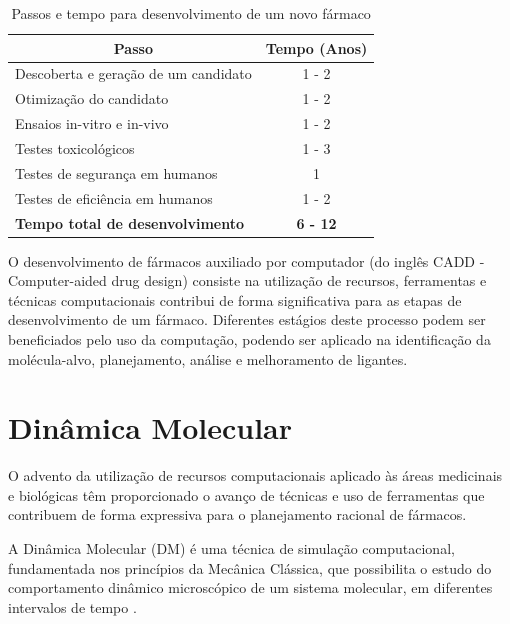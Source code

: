 \begin{table}[h]
	\caption{Passos e tempo para desenvolvimento de um novo fármaco \cite{kun92}}
	\label{tab:rddtempo}
	\centering
	\begin{tabular}{@{}lc@{}}
	\toprule
	\multicolumn{1}{c}{\textbf{Passo}}      & \textbf{Tempo (Anos)} \\ \midrule
	Descoberta e geração de um candidato    & 1 - 2                 \\
	Otimização do candidato                 & 1 - 2                 \\
	Ensaios in-vitro e in-vivo              & 1 - 2                 \\
	Testes toxicológicos                    & 1 - 3                 \\
	Testes de segurança em humanos          & 1                     \\
	Testes de eficiência em humanos         & 1 - 2                 \\ \midrule
	\textbf{Tempo total de desenvolvimento} & \textbf{6 - 12}       \\ \bottomrule
	\end{tabular}
\end{table}

O desenvolvimento de fármacos auxiliado por computador (do inglês CADD - Computer-aided drug design) consiste na utilização de recursos, ferramentas e técnicas computacionais contribui de forma significativa para as etapas de desenvolvimento de um fármaco.  Diferentes estágios deste processo podem ser beneficiados pelo uso da computação, podendo ser aplicado na identificação da molécula-alvo, planejamento, análise e melhoramento de ligantes.


\section{Dinâmica Molecular}

O advento da utilização de recursos computacionais aplicado às áreas medicinais e biológicas têm proporcionado o avanço de técnicas e uso de ferramentas que contribuem de forma expressiva para o planejamento racional de fármacos.

A Dinâmica Molecular (DM) é uma técnica de simulação computacional, fundamentada nos princípios da Mecânica Clássica, que possibilita o estudo do comportamento dinâmico microscópico de um sistema molecular, em diferentes intervalos de tempo \cite{nam08}. 

